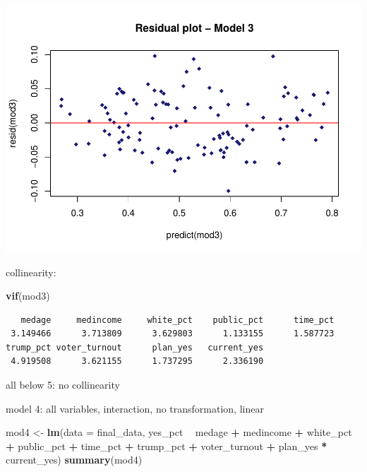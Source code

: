 \documentclass[
]{article}
\newenvironment{Shaded}{\begin{snugshade}}{\end{snugshade}}
\newcommand{\DataTypeTok}[1]{\textcolor[rgb]{0.13,0.29,0.53}{#1}}
\newcommand{\KeywordTok}[1]{\textcolor[rgb]{0.13,0.29,0.53}{\textbf{#1}}}
\newcommand{\NormalTok}[1]{#1}
\newcommand{\OperatorTok}[1]{\textcolor[rgb]{0.81,0.36,0.00}{\textbf{#1}}}
\newcommand{\StringTok}[1]{\textcolor[rgb]{0.31,0.60,0.02}{#1}}
\begin{document}
\includegraphics{Zhong_paper_files/figure-latex/unnamed-chunk-8-1.pdf}

collinearity:

\begin{Shaded}
\begin{Highlighting}[]
\KeywordTok{vif}\NormalTok{(mod3)}
\end{Highlighting}
\end{Shaded}

\begin{verbatim}
   medage     medincome     white_pct    public_pct      time_pct 
 3.149466      3.713809      3.629803      1.133155      1.587723 
trump_pct voter_turnout      plan_yes   current_yes 
 4.919508      3.621155      1.737295      2.336190 
\end{verbatim}

all below 5: no collinearity

model 4: all variables, interaction, no transformation, linear

\begin{Shaded}
\begin{Highlighting}[]
\NormalTok{mod4 <-}\StringTok{ }\KeywordTok{lm}\NormalTok{(}\DataTypeTok{data =}\NormalTok{ final_data, yes_pct }\OperatorTok{~}\StringTok{ }\NormalTok{medage }\OperatorTok{+}\StringTok{ }\NormalTok{medincome }\OperatorTok{+}\StringTok{ }\NormalTok{white_pct }\OperatorTok{+}\StringTok{ }\NormalTok{public_pct }\OperatorTok{+}\StringTok{ }\NormalTok{time_pct }\OperatorTok{+}\StringTok{ }\NormalTok{trump_pct }\OperatorTok{+}\StringTok{ }\NormalTok{voter_turnout }\OperatorTok{+}\StringTok{ }\NormalTok{plan_yes }\OperatorTok{*}\StringTok{ }\NormalTok{current_yes)}
\KeywordTok{summary}\NormalTok{(mod4)}
\end{Highlighting}
\end{Shaded}
\end{document}
